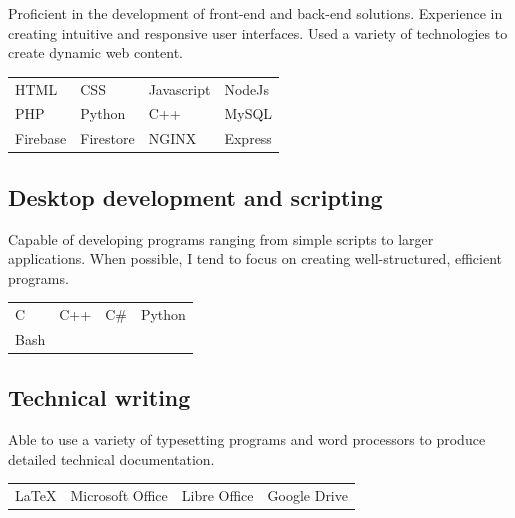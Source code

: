 \documentclass[letterpaper]{article}
\begin{document}
        Proficient in the development of front-end and back-end solutions.
        Experience in creating intuitive and responsive user interfaces.
        Used a variety of technologies to create dynamic web content.

        \begin{center}
        \begin{tabular}{p{} p{} p{} p{}}
            HTML & CSS & Javascript & NodeJs \\
            PHP & Python & C++ & MySQL \\
            Firebase & Firestore & NGINX & Express \\
        \end{tabular}
        \end{center}

        \subsection*{Desktop development and scripting}

        Capable of developing programs ranging from simple scripts to larger applications.
        When possible, I tend to focus on creating well-structured, efficient programs.

        \begin{center}
        \begin{tabular}{p{} p{} p{} p{}}
            C & C++ & C\# & Python \\
            Bash &&&\\
        \end{tabular}
        \end{center}

        \subsection*{Technical writing}

        Able to use a variety of typesetting programs and word processors to produce detailed technical documentation.

        \begin{center}
        \begin{tabular}{p{} p{} p{} p{}}
            LaTeX & Microsoft Office & Libre Office & Google Drive \\
        \end{tabular}
        \end{center}
\end{document}
